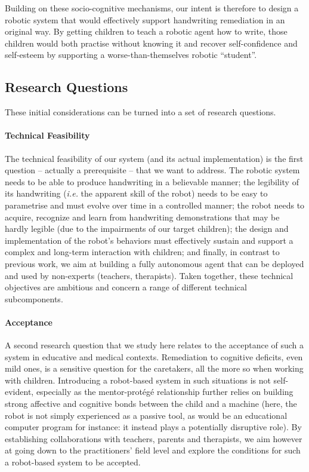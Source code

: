 \documentclass{article}
\newcommand{\ie}{\textit{i.e.}\xspace}
\begin{document}
Building on these socio-cognitive mechanisms, our intent is therefore to design
a robotic system that would effectively support handwriting remediation in an
original way. By getting children to teach a robotic agent how to write, those
children would both practise without knowing it and recover self-confidence and
self-esteem by supporting a worse-than-themselves robotic ``student''.

\subsection{Research Questions}

These initial considerations can be turned into a set of research questions.

\paragraph{Technical Feasibility} The technical feasibility of our system (and
its actual implementation) is the first question -- actually a prerequisite --
that we want to address. The robotic system needs to be able to produce
handwriting in a believable manner; the legibility of its handwriting (\ie the
apparent skill of the robot) needs to be easy to parametrise and must evolve
over time in a controlled manner; the robot needs to acquire, recognize and
learn from handwriting demonstrations that may be hardly legible (due to the
impairments of our target children); the design and implementation of the
robot's behaviors must effectively sustain and support a complex and long-term
interaction with children; and finally, in contrast to previous work, we aim at
building a fully autonomous agent that can be deployed and used by non-experts
(teachers, therapists). Taken together, these technical objectives are
ambitious and concern a range of different technical subcomponents.

\paragraph{Acceptance} A second research question that we study here relates to
the acceptance of such a system in educative and medical contexts. Remediation
to cognitive deficits, even mild ones, is a sensitive question for the
caretakers, all the more so when working with children. Introducing a
robot-based system in such situations is not self-evident, especially as the
mentor-protégé relationship further relies on building strong affective and
cognitive bonds between the child and a machine (here, the robot is not simply
experienced as a passive tool, as would be an educational computer program for
instance: it instead plays a potentially disruptive role). By establishing
collaborations with teachers, parents and therapists, we aim however at going
down to the practitioners' field level and explore the conditions for such a
robot-based system to be accepted.
\end{document}
